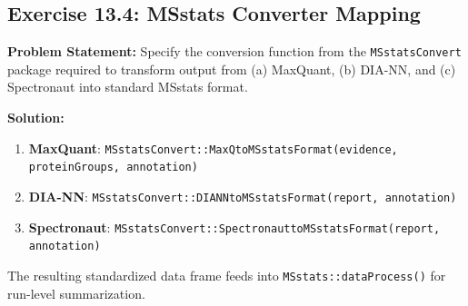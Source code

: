 \documentclass[11pt,twoside,openright]{book}
\begin{document}
\subsection*{Exercise 13.4: MSstats Converter Mapping}
\noindent\textbf{Problem Statement:}\enspace
Specify the conversion function from the \texttt{MSstatsConvert} package required to transform output from (a) MaxQuant, (b) DIA-NN, and (c) Spectronaut into standard MSstats format.

\noindent\textbf{Solution:}\enspace
\begin{enumerate}
\item \textbf{MaxQuant}: \texttt{MSstatsConvert::MaxQtoMSstatsFormat(evidence, proteinGroups, annotation)}
\item \textbf{DIA-NN}: \texttt{MSstatsConvert::DIANNtoMSstatsFormat(report, annotation)}
\item \textbf{Spectronaut}: \texttt{MSstatsConvert::SpectronauttoMSstatsFormat(report, annotation)}
\end{enumerate}
The resulting standardized data frame feeds into \texttt{MSstats::dataProcess()} for run-level summarization.
\end{document}
